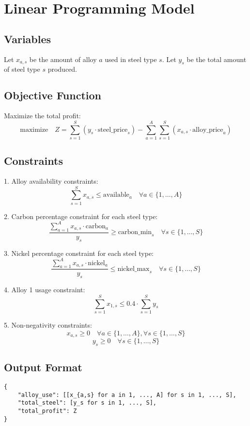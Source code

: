 \documentclass{article}
\begin{document}
\section*{Linear Programming Model}

\subsection*{Variables}
Let \( x_{a,s} \) be the amount of alloy \( a \) used in steel type \( s \).  
Let \( y_s \) be the total amount of steel type \( s \) produced.

\subsection*{Objective Function}
Maximize the total profit:
\[
\text{maximize} \quad Z = \sum_{s=1}^{S} (y_s \cdot \text{steel\_price}_{s}) - \sum_{a=1}^{A} \sum_{s=1}^{S} (x_{a,s} \cdot \text{alloy\_price}_{a})
\]

\subsection*{Constraints}

1. Alloy availability constraints:
\[
\sum_{s=1}^{S} x_{a,s} \leq \text{available}_{a} \quad \forall a \in \{1, \ldots, A\}
\]

2. Carbon percentage constraint for each steel type:
\[
\frac{\sum_{a=1}^{A} x_{a,s} \cdot \text{carbon}_{a}}{y_s} \geq \text{carbon\_min}_{s} \quad \forall s \in \{1, \ldots, S\}
\]

3. Nickel percentage constraint for each steel type:
\[
\frac{\sum_{a=1}^{A} x_{a,s} \cdot \text{nickel}_{a}}{y_s} \leq \text{nickel\_max}_{s} \quad \forall s \in \{1, \ldots, S\}
\]

4. Alloy 1 usage constraint:
\[
\sum_{s=1}^{S} x_{1,s} \leq 0.4 \cdot \sum_{s=1}^{S} y_s
\]

5. Non-negativity constraints:
\[
x_{a,s} \geq 0 \quad \forall a \in \{1, \ldots, A\}, \forall s \in \{1, \ldots, S\}
\]
\[
y_s \geq 0 \quad \forall s \in \{1, \ldots, S\}
\]

\subsection*{Output Format}
\begin{verbatim}
{
    "alloy_use": [[x_{a,s} for a in 1, ..., A] for s in 1, ..., S],
    "total_steel": [y_s for s in 1, ..., S],
    "total_profit": Z
}
\end{verbatim}
\end{document}
